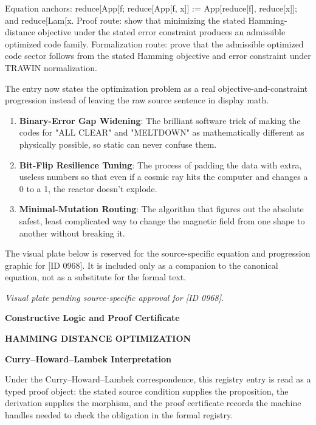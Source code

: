 Equation anchors: reduce[App[f; reduce[App[f, x]] := App[reduce[f], reduce[x]]; and reduce[Lam[x. Proof route: show that minimizing the stated Hamming-distance objective under the stated error constraint produces an admissible optimized code family. Formalization route: prove that the admissible optimized code sector follows from the stated Hamming objective and error constraint under TRAWIN normalization.

The entry now states the optimization problem as a real objective-and-constraint progression instead of leaving the raw source sentence in display math.
\endgroup

\begin{enumerate}[leftmargin=1.6em,itemsep=6pt,topsep=4pt]
\item \textbf{Binary-Error Gap Widening}: The brilliant software trick of making the codes for "ALL CLEAR" and "MELTDOWN" as mathematically different as physically possible, so static can never confuse them.
\item \textbf{Bit-Flip Resilience Tuning}: The process of padding the data with extra, useless numbers so that even if a cosmic ray hits the computer and changes a 0 to a 1, the reactor doesn't explode.
\item \textbf{Minimal-Mutation Routing}: The algorithm that figures out the absolute safest, least complicated way to change the magnetic field from one shape to another without breaking it.
\end{enumerate}

\begingroup\footnotesize\sloppy
The visual plate below is reserved for the source-specific equation and progression graphic for [ID 0968]. It is included only as a companion to the canonical equation, not as a substitute for the formal text.
\par\endgroup
\begingroup\footnotesize\itshape
Visual plate pending source-specific approval for [ID 0968].
\par\endgroup

\clearpage
\begingroup\tzpsupportsetup
\noindent\textbf{\fontsize{10.8pt}{12.8pt}\selectfont [ID 0968] Constructive Logic and Proof Certificate}\par
\noindent\textbf{\fontsize{10pt}{12pt}\selectfont HAMMING DISTANCE OPTIMIZATION}\par
\vspace{0.45em}
\begingroup
\footnotesize
\setlength{\parskip}{0.22em}
\setlength{\parindent}{0pt}
\noindent\textbf{Curry--Howard--Lambek Interpretation}\par
Under the Curry--Howard--Lambek correspondence, this registry entry is read as a typed proof
object: the stated source condition supplies the proposition, the derivation supplies the
morphism, and the proof certificate records the machine handles needed to check the obligation
in the formal registry.

